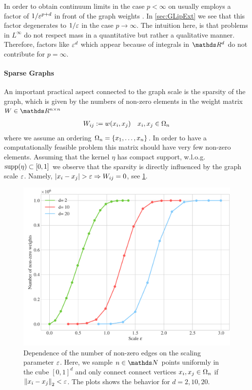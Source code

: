 %
%
%
\begin{remark}{}{}
In order to obtain continuum limits in the case $p<\infty$ on usually employs a factor of $1/\varepsilon^{p+d}$ in front of the graph weights \cite{GarcSlep15, slepcev2019analysis}. In \cref{sec:GLipExt} we see that this factor degenerates to $1/\varepsilon$ in the case $p\to\infty$. The intuition here, is that problems in $L^\infty$ do not respect mass in a quantitative but rather a qualitative manner. Therefore, factors like $\varepsilon^d$ which appear because of integrals in $\R^d$ do not contribute for $p=\infty$.
\end{remark}
%
%
\paragraph{Sparse Graphs}
An important practical aspect connected to the graph scale is the sparsity of the graph, which is given by the numbers of non-zero elements in the weight matrix $W\in\R^{n\times n}$
%
\begin{align*}
W_{ij}:= w(x_i,x_j) \quad x_i,x_j\in\Omega_n
\end{align*}
%
where we assume an ordering $\Omega_n=\{x_1,\ldots, x_n\}$. In order to have a computationally feasible problem this matrix should have very few non-zero elements. Assuming that the kernel $\eta$ has compact support, w.l.o.g. $\mathrm{supp}(\eta)\subset [0,1]$ we observe that the sparsity is directly influenced by the graph scale $\gscale$. Namely, $\left|x_i-x_j\right| > \varepsilon \Rightarrow W_{ij}=0$, see \cref{fig:graphscale}.
%
%
\begin{figure}
\centering
\includegraphics[width=.5\textwidth]{code/SSL/NNZ.pdf}
\caption[Dependence of the number of non-zero edges on the scaling parameter $\gscale$.]{Dependence of the number of non-zero edges on the scaling parameter $\gscale$. Here, we sample $n\in\N$ points uniformly in the cube $[0,1]^d$ and only connect connect vertices $x_i,x_j\in\Omega_n$ if $\left\|x_i-x_j\right\|_2 < \varepsilon$. The plots shows the behavior for $d=2,10,20$.}\label{fig:graphscale}
\end{figure} 

